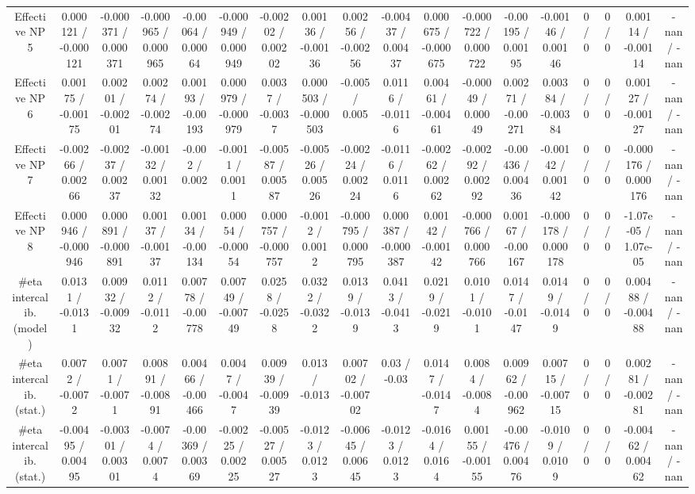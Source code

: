 \documentclass[10pt]{article}
\begin{document}
\begin{table}[htbp]
\begin{center}
\begin{tabular}{|c|c|c|c|c|c|c|c|c|c|c|c|c|c|c|c|c|c|}
  Effective NP 5 & 0.000121 / -0.000121 & -0.000371 / 0.000371 & -0.000965 / 0.000965 & -0.00064 / 0.00064 & -0.000949 / 0.000949 & -0.00202 / 0.00202 & 0.00136 / -0.00136 & 0.00256 / -0.00256 & -0.00437 / 0.00437 & 0.000675 / -0.000675 & -0.000722 / 0.000722 & -0.00195 / 0.00195 & -0.00146 / 0.00146 & 0 / 0 & 0 / 0 & 0.00114 / -0.00114 & -nan / -nan \\ 
  Effective NP 6 & 0.00175 / -0.00175 & 0.00201 / -0.00201 & 0.00274 / -0.00274 & 0.00193 / -0.00193 & 0.000979 / -0.000979 & 0.0037 / -0.0037 & 0.000503 / -0.000503 & -0.005 / 0.005 & 0.0116 / -0.0116 & 0.00461 / -0.00461 & -0.00049 / 0.00049 & 0.00271 / -0.00271 & 0.00384 / -0.00384 & 0 / 0 & 0 / 0 & 0.00127 / -0.00127 & -nan / -nan \\ 
  Effective NP 7 & -0.00266 / 0.00266 & -0.00237 / 0.00237 & -0.00132 / 0.00132 & -0.002 / 0.002 & -0.0011 / 0.0011 & -0.00587 / 0.00587 & -0.00526 / 0.00526 & -0.00224 / 0.00224 & -0.0116 / 0.0116 & -0.00262 / 0.00262 & -0.00292 / 0.00292 & -0.00436 / 0.00436 & -0.00142 / 0.00142 & 0 / 0 & 0 / 0 & -0.000176 / 0.000176 & -nan / -nan \\ 
  Effective NP 8 & 0.000946 / -0.000946 & 0.000891 / -0.000891 & 0.00137 / -0.00137 & 0.00134 / -0.00134 & 0.00054 / -0.00054 & 0.000757 / -0.000757 & -0.0012 / 0.0012 & -0.000795 / 0.000795 & 0.000387 / -0.000387 & 0.00142 / -0.00142 & -0.000766 / 0.000766 & 0.00167 / -0.00167 & -0.000178 / 0.000178 & 0 / 0 & 0 / 0 & -1.07e-05 / 1.07e-05 & -nan / -nan \\ 
  #eta intercalib. (model) & 0.0131 / -0.0131 & 0.00932 / -0.00932 & 0.0112 / -0.0112 & 0.00778 / -0.00778 & 0.00749 / -0.00749 & 0.0258 / -0.0258 & 0.0322 / -0.0322 & 0.0139 / -0.0139 & 0.0413 / -0.0413 & 0.0219 / -0.0219 & 0.0101 / -0.0101 & 0.0147 / -0.0147 & 0.0149 / -0.0149 & 0 / 0 & 0 / 0 & 0.00488 / -0.00488 & -nan / -nan \\ 
  #eta intercalib. (stat.) & 0.0072 / -0.0072 & 0.0071 / -0.0071 & 0.00891 / -0.00891 & 0.00466 / -0.00466 & 0.0047 / -0.0047 & 0.00939 / -0.00939 & 0.013 / -0.013 & 0.00702 / -0.00702 & 0.03 / -0.03 & 0.0147 / -0.0147 & 0.0084 / -0.0084 & 0.00962 / -0.00962 & 0.00715 / -0.00715 & 0 / 0 & 0 / 0 & 0.00281 / -0.00281 & -nan / -nan \\ 
  #eta intercalib. (stat.) & -0.00495 / 0.00495 & -0.00301 / 0.00301 & -0.0074 / 0.0074 & -0.00369 / 0.00369 & -0.00225 / 0.00225 & -0.00527 / 0.00527 & -0.0123 / 0.0123 & -0.00645 / 0.00645 & -0.0123 / 0.0123 & -0.0164 / 0.0164 & 0.00155 / -0.00155 & -0.00476 / 0.00476 & -0.0109 / 0.0109 & 0 / 0 & 0 / 0 & -0.00462 / 0.00462 & -nan / -nan \\ 

\end{tabular}
\end{center}
\end{table}
\end{document}
